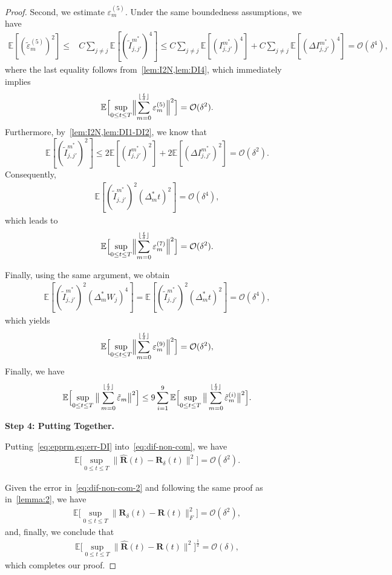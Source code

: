 \documentclass[11pt, a4paper, onecolumn]{article}
\newcommand{\E}{\mathbb{E}}
\newcommand{\bfR}{\mathbf{R}}
\newcommand{\hatR}{\widehat{\bfR}}
\newcommand{\calO}{\mathcal{O}}
\newcommand{\ms}{{m^*}}
\newcommand{\Dms}{{\Delta^{*}_{m}}}
\newcommand{\Ijjpms}{ {I_{j,j'}^{\ms}} }
\newcommand{\tIjjpms}{ { \tilde I_{j,j'}^{\ms}} }
\newcommand{\DIjjpms}{\Delta{I_{j,j'}^{\ms}}}
\newcommand{\sumub}{{\lfloor \frac{t}{\delta} \rfloor}}
\newcommand{\half}{{\frac{1}{2}}}
\newcommand{\epprm}{\tilde\varepsilon_m}
\newcommand{\epprmn}[1]{\tilde\varepsilon_m^{(#1)}}
\newcommand{\EsupN}[1]{\E\Bigl[ \sup_{0 \le t\le T} \big\| \sum_{m=0}^{\sumub} #1 \big\|^2 \Bigr]}
\begin{document}
\begin{appendices}
\begin{proof}
Second, we estimate $\varepsilon_m^{(5)}$.  
Under the same boundedness assumptions, we have
\begin{align*}
\E[(\epprmn{5})^2] \le & C\sum_{j\neq j}\E[(\tIjjpms)^4] \le C\sum_{j\neq j}\E[(\Ijjpms)^4] +  C\sum_{j\neq j}\E[(\DIjjpms)^4]  = \mathcal{O}(\delta^4),
\end{align*}
where the last equality follows from~\cref{lem:I2N,lem:DI4}, which immediately implies
\begin{align*}
    \E\Bigl[\sup_{0 \le t\le T}
      \Bigl\|\sum_{m=0}^{\sumub}\varepsilon_m^{(5)}\Bigr\|^2\Bigr]
    = \mathcal{O}(\delta^2).
\end{align*}
Furthermore, by~\cref{lem:I2N,lem:DI1-DI2}, we know that 
\[\E[(\tIjjpms)^2] \le 2 \E[(\Ijjpms)^2] + 2 \E[(\DIjjpms)^2] = \mathcal{O}(\delta^2).\]  
Consequently,
\begin{align*}
    \E[(\tIjjpms)^2(\Dms t)^2] = \mathcal{O}(\delta^4),
\end{align*}
which leads to
\begin{align*}
    \E\Bigl[\sup_{0 \le t\le T}
      \Bigl\|\sum_{m=0}^{\sumub}\varepsilon_m^{(7)}\Bigr\|^2\Bigr]
    = \mathcal{O}(\delta^2).
\end{align*}

Finally, using the same argument, we obtain
\begin{align*}
  \E[(\tIjjpms)^2(\Dms W_j)^4]  =\E[(\tIjjpms)^2(\Dms t)^2]
    = \mathcal{O}(\delta^4),
\end{align*}
which yields
\begin{align*}
    \E\Bigl[\sup_{0 \le t\le T}
      \Bigl\|\sum_{m=0}^{\sumub}\varepsilon_m^{(9)}\Bigr\|^2\Bigr]
    = \mathcal{O}(\delta^2),
\end{align*}
Finally, we have
\begin{align}\label{eq:epprm}
    \EsupN{\epprm} \le 9\sum_{i=1}^9\EsupN{\epprmn{i}}.
\end{align}

\noindent\textbf{Step 4: Putting Together.}  


Putting~\cref{eq:epprm,eq:err-DI} into~\cref{eq:dif-non-com}, we have
\begin{align}\label{eq:dif-non-com-2}
     \E\big[ \sup_{0 \le t\le T}\| \hatR(t)- \bfR_\delta(t) \|^2 \big] = \calO(\delta^2).
\end{align}

Given the error in~\cref{eq:dif-non-com-2} and following the same proof as in~\cref{lemma:2}, we have
\begin{align*}
    \E\big[ \sup_{0 \le t\le T} \|  \bfR_\delta(t) - \bfR(t)\|^2_F \big]  = \calO(\delta^2),
\end{align*}
and, finally, we conclude that
\begin{align*}
     \E\big[ \sup_{0 \le t\le T}\| \hatR(t)- \bfR(t) \|^2 \big]^{\half} = \calO(\delta),
\end{align*}
which completes our proof.



\end{proof}
\end{appendices}
\end{document}
